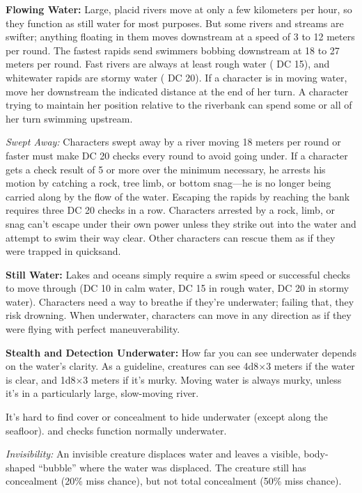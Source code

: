 \textbf{Flowing Water:} Large, placid rivers move at only a few kilometers per hour, so they function as still water for most purposes. But some rivers and streams are swifter; anything floating in them moves downstream at a speed of 3 to 12 meters per round. The fastest rapids send swimmers bobbing downstream at 18 to 27 meters per round. Fast rivers are always at least rough water ( DC 15), and whitewater rapids are stormy water ( DC 20). If a character is in moving water, move her downstream the indicated distance at the end of her turn. A character trying to maintain her position relative to the riverbank can spend some or all of her turn swimming upstream.

\textit{Swept Away:} Characters swept away by a river moving 18 meters per round or faster must make DC 20  checks every round to avoid going under. If a character gets a check result of 5 or more over the minimum necessary, he arrests his motion by catching a rock, tree limb, or bottom snag---he is no longer being carried along by the flow of the water. Escaping the rapids by reaching the bank requires three DC 20  checks in a row. Characters arrested by a rock, limb, or snag can't escape under their own power unless they strike out into the water and attempt to swim their way clear. Other characters can rescue them as if they were trapped in quicksand.

\textbf{Still Water:} Lakes and oceans simply require a swim speed or successful  checks to move through (DC 10 in calm water, DC 15 in rough water, DC 20 in stormy water). Characters need a way to breathe if they're underwater; failing that, they risk drowning. When underwater, characters can move in any direction as if they were flying with perfect maneuverability.

\textbf{Stealth and Detection Underwater:} How far you can see underwater depends on the water's clarity. As a guideline, creatures can see 4d8$\times$3 meters if the water is clear, and 1d8$\times$3 meters if it's murky. Moving water is always murky, unless it's in a particularly large, slow-moving river.

It's hard to find cover or concealment to hide underwater (except along the seafloor).  and  checks function normally underwater.

\textit{Invisibility:} An invisible creature displaces water and leaves a visible, body-shaped ``bubble'' where the water was displaced. The creature still has concealment (20\% miss chance), but not total concealment (50\% miss chance).

